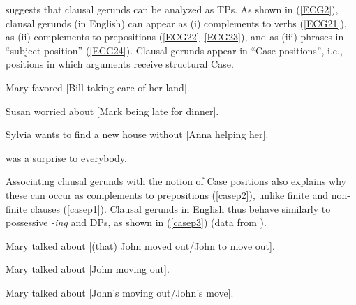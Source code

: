 \documentclass[output=paper,colorlinks,citecolor=brown]{langscibook}
\begin{document}
\citet[16]{pires2007} suggests that clausal gerunds can be analyzed as TPs. As shown in (\ref{ECG2}), clausal gerunds (in English) can appear as (i) complements to verbs (\ref{ECG21}), as (ii) complements to prepositions (\ref{ECG22}--\ref{ECG23}), and as (iii) phrases in “subject position” (\ref{ECG24}). Clausal gerunds appear in “Case positions”, i.e., positions in which arguments receive structural Case.

\begin{exe}

\item \label{ECG2}

\begin{xlist}

\item Mary favored [Bill taking care of her land]. \label{ECG21}
\item Susan worried about [Mark being late for dinner]. \label{ECG22}
\item Sylvia wants to find a new house without [Anna helping her]. \label{ECG23}
\item{} was a surprise to everybody. \label{ECG24}

\end{xlist}

\end{exe}

Associating clausal gerunds with the notion of Case positions also explains why these can occur as complements to prepositions (\ref{casep2}), unlike finite and non-finite clauses (\ref{casep1}). Clausal gerunds in English thus behave similarly to possessive \textit{-ing} and DPs, as shown in (\ref{casep3}) (data from \citealt[21]{pires2007}).

\begin{exe}

\item \label{caseposition}

\begin{xlist}

\item *Mary talked about [(that) John moved out/John to move out]. \label{casep1}

\item Mary talked about [John moving out]. \label{casep2}

\item Mary talked about [John's moving out/John's move]. \label{casep3}

\end{xlist}

\end{exe}
\end{document}
